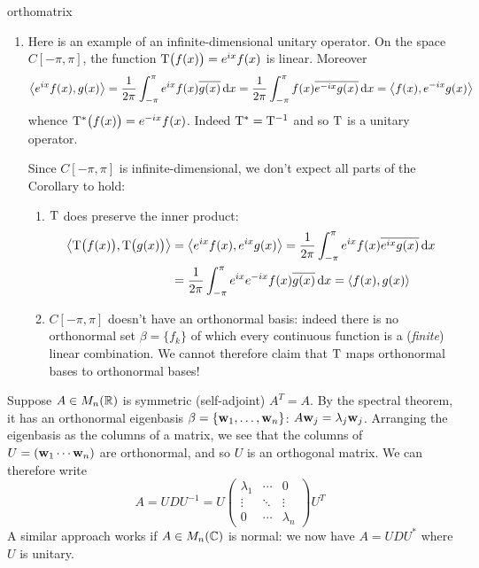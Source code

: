 \begin{examples}{}{orthomatrix}
\begin{enumerate}
		\item\label{ex:infdimunitary} Here is an example of an infinite-dimensional unitary operator. On the space $C[-\pi,\pi]$, the function $\mathrm{T}\big(f(x)\big)=e^{ix}f(x)$ is linear. Moreover
		\[
			\left\langle e^{ix}f(x),g(x)\right\rangle
			=\frac 1{2\pi}\int_{-\pi}^\pi e^{ix}f(x)\overline{g(x)}\,{\mathrm{d} x} 
			=\frac 1{2\pi}\int_{-\pi}^\pi f(x)\overline{e^{-ix}g(x)}\,{\mathrm{d} x} 
			=\left\langle f(x),e^{-ix}g(x)\right\rangle
		\]
		whence $\mathrm{T}^*\big(f(x)\big)=e^{-ix}f(x)$. Indeed $\mathrm{T}^*=\mathrm{T}^{-1}$ and so $\mathrm{T}$ is a unitary operator.\par
		Since $C[-\pi,\pi]$ is infinite-dimensional, we don't expect all parts of the Corollary to hold:
		\begin{enumerate}
		  \item $\mathrm{T}$ does preserve the inner product:
		  \begin{align*}
		  	\left\langle \mathrm{T}\big(f(x)\big),\mathrm{T}\big(g(x)\big)\right\rangle
		  	&=\left\langle e^{ix}f(x),e^{ix}g(x)\right\rangle
		  	=\frac 1{2\pi}\int_{-\pi}^\pi e^{ix}f(x)\overline{e^{ix}g(x)}\,{\mathrm{d} x}\\
		  	&=\frac 1{2\pi}\int_{-\pi}^\pi e^{ix}e^{-ix}f(x)\overline{g(x)}\,{\mathrm{d} x}
		  	=\left\langle f(x),g(x)\right\rangle
		  \end{align*}
		  \item[(b), (c)] $C[-\pi,\pi]$ doesn't have an orthonormal basis: indeed there is no orthonormal set $\beta=\{f_k\}$ of which every continuous function is a (\emph{finite}) linear combination.\footnotemark{} We cannot therefore claim that $\mathrm{T}$ maps orthonormal bases to orthonormal bases!
		\end{enumerate}
	\end{enumerate}
\end{examples}



\pagebreak[3]



Suppose $A\in M_n(\mathbb{R})$ is symmetric (self-adjoint) $A^T=A$. By the spectral theorem, it has an orthonormal eigenbasis $\beta=\{{\mathbf{{\mathbf{w}}}}_1,\ldots,{\mathbf{{\mathbf{w}}}}_{n}\}$: $A{\mathbf{w}}_j=\lambda_j{\mathbf{w}}_j$. Arranging the eigenbasis as the columns of a matrix, we see that the columns of $U=({\mathbf{w}}_1\cdots {\mathbf{w}}_n)$ are orthonormal, and so $U$ is an orthogonal matrix. We can therefore write
\[
	A=UDU^{-1}=U
	\begin{pmatrix}
		\lambda_1&\cdots&0\\
		\vdots&\ddots&\vdots\\
		0&\cdots&\lambda_n
	\end{pmatrix}
	U^T
\]
A similar approach works if $A\in M_n(\mathbb{C})$ is normal: we now have $A=UDU^*$ where $U$ is unitary.

